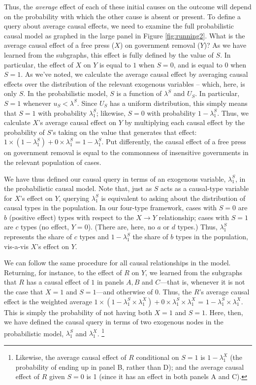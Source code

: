 \documentclass[12pt,]{book}
\let\rmarkdownfootnote\footnote%
\def\footnote{\protect\rmarkdownfootnote}
\begin{document}
Thus, the \emph{average} effect of each of these initial causes on the outcome will depend on the probability with which the other cause is absent or present. To define a query about average causal effects, we need to examine the full probabilistic causal model as graphed in the large panel in Figure \ref{fig:running2}. What is the average causal effect of a free press (\(X\)) on government removal (\(Y\))? As we have learned from the subgraphs, this effect is fully defined by the value of \(S\). In particular, the effect of \(X\) on \(Y\) is equal to \(1\) when \(S=0\), and is equal to \(0\) when \(S=1\). As we've noted, we calculate the average causal effect by averaging causal effects over the distribution of the relevant exogenous variables -- which, here, is only \(S\). In the probabilistic model, \(S\) is a function of \(\lambda^S\) and \(U_S\). In particular, \(S=1\) whenever \(u_S < \lambda^S\). Since \(U_S\) has a uniform distribution, this simply means that \(S=1\) with probability \(\lambda_1^S\); likewise, \(S=0\) with probability \(1-\lambda_1^S\). Thus, we calculate \(X\)'s average causal effect on \(Y\) by multiplying each causal effect by the probability of \(S\)'s taking on the value that generates that effect: \(1 \times (1-\lambda_1^S) + 0 \times \lambda_1^S = 1-\lambda_1^S\). Put differently, the causal effect of a free press on government removal is equal to the commonness of insensitive governments in the relevant population of cases.

We have thus defined our causal query in terms of an exogenous variable, \(\lambda_1^S\), in the probabilistic causal model. Note that, just as \(S\) acts as a causal-type variable for \(X\)'s effect on \(Y\), querying \(\lambda_1^S\) is equivalent to asking about the distribution of causal types in the population. In our four-type framework, cases with \(S=0\) are \(b\) (positive effect) types with respect to the \(X \rightarrow Y\) relationship; cases with \(S=1\) are \(c\) types (no effect, \(Y=0\)). (There are, here, no \(a\) or \(d\) types.) Thus, \(\lambda_1^S\) represents the share of \(c\) types and \(1-\lambda_1^S\) the share of \(b\) types in the population, vis-a-vis \(X\)'s effect on \(Y\).

We can follow the same procedure for all causal relationships in the model. Returning, for instance, to the effect of \(R\) on \(Y\), we learned from the subgraphs that \(R\) has a causal effect of \(1\) in panels \(A,B\) and \(C\)---that is, whenever it is not the case that \(X=1\) and \(S=1\)---and otherwise of \(0\). Thus, the \(R\)'s average causal effect is the weighted average \(1 \times (1-\lambda_1^S \times \lambda_1^X) + 0 \times \lambda_1^S \times \lambda_1^X\) = \(1-\lambda_1^S \times \lambda_1^X\). This is simply the probability of not having both \(X=1\) and \(S=1\). Here, then, we have defined the causal query in terms of two exogenous nodes in the probabilistic model, \(\lambda_1^S\) and \(\lambda_1^X\). \footnote{Likewise, the average causal effect of \(R\) conditional on \(S=1\) is \(1-\lambda_1^X\) (the probability of ending up in panel B, rather than D); and the average causal effect of \(R\) given \(S=0\) is 1 (since it has an effect in both panels A and C).}
\end{document}
